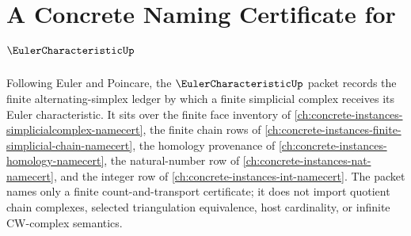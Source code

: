 \chapter{A Concrete Naming Certificate for $\EulerCharacteristicUp$}
\label{ch:concrete-instances-euler-characteristic-namecert}

Following Euler and Poincare, the $\EulerCharacteristicUp$ packet records the finite alternating-simplex ledger by which a finite simplicial complex receives its Euler characteristic. It sits over the finite face inventory of \autoref{ch:concrete-instances-simplicialcomplex-namecert}, the finite chain rows of \autoref{ch:concrete-instances-finite-simplicial-chain-namecert}, the homology provenance of \autoref{ch:concrete-instances-homology-namecert}, the natural-number row of \autoref{ch:concrete-instances-nat-namecert}, and the integer row of \autoref{ch:concrete-instances-int-namecert}. The packet names only a finite count-and-transport certificate; it does not import quotient chain complexes, selected triangulation equivalence, host cardinality, or infinite CW-complex semantics.

